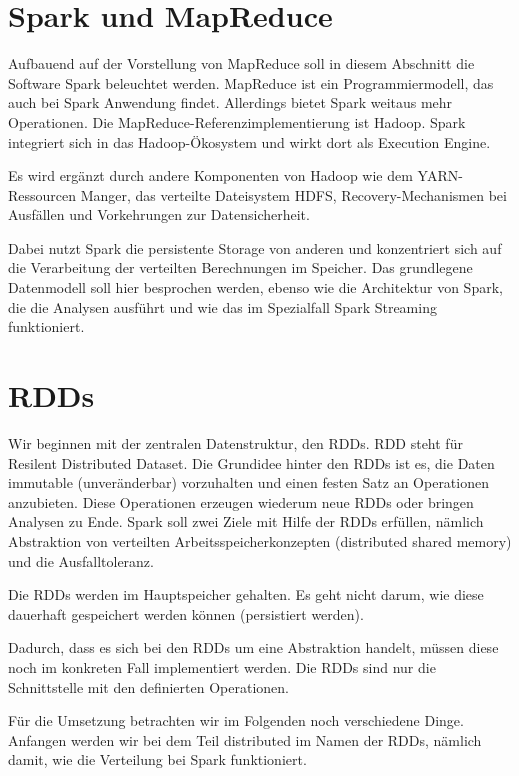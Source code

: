 \documentclass[letterpaper]{article}
\author{}
\date{2018-10-07T22:03:22.534430203}
\begin{document}
\section[Spark und MapReduce]{\rmfamily Spark
und MapReduce}
{
Aufbauend auf der Vorstellung von MapReduce soll in diesem Abschnitt die
Software Spark beleuchtet werden. MapReduce ist ein Programmiermodell,
das auch bei Spark Anwendung findet. Allerdings bietet Spark weitaus
mehr Operationen. Die MapReduce-Referenzimplementierung ist Hadoop.
Spark integriert sich in das Hadoop-Ökosystem und wirkt dort als
Execution Engine.}

{
Es wird ergänzt durch andere Komponenten von Hadoop wie dem
YARN-Ressourcen Manger, das verteilte Dateisystem HDFS,
Recovery-Mechanismen bei Ausfällen und Vorkehrungen zur
Datensicherheit.}

{
Dabei nutzt Spark die persistente Storage von anderen und konzentriert
sich auf die Verarbeitung der verteilten Berechnungen im Speicher. Das
grundlegene Datenmodell soll hier besprochen werden, ebenso wie die
Architektur von Spark, die die Analysen ausführt und wie das im Spezialfall
Spark Streaming funktioniert.}

\section[RDDs]{\rmfamily RDDs}
Wir beginnen mit der zentralen Datenstruktur, den RDDs. RDD steht für
Resilent Distributed Dataset. Die Grundidee hinter den RDDs ist es, die
Daten immutable (unveränderbar) vorzuhalten und einen festen Satz an
Operationen anzubieten. Diese Operationen erzeugen wiederum neue RDDs
oder bringen Analysen zu Ende. Spark soll zwei Ziele mit Hilfe der RDDs
erfüllen, nämlich Abstraktion von verteilten Arbeitsspeicherkonzepten
(distributed shared memory) und die Ausfalltoleranz.

Die RDDs werden im Hauptspeicher gehalten. Es geht nicht darum, wie
diese dauerhaft gespeichert werden können (persistiert werden).

Dadurch, dass es sich bei den RDDs um eine Abstraktion handelt, müssen
diese noch im konkreten Fall implementiert werden. Die RDDs sind nur
die Schnittstelle mit den definierten Operationen.

Für die Umsetzung betrachten wir im Folgenden noch verschiedene Dinge.
Anfangen werden wir bei dem Teil distributed im Namen der RDDs, nämlich
damit, wie die Verteilung bei Spark funktioniert.
\end{document}

